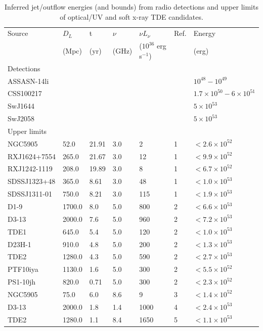 \documentclass[usenatbib,fleqn]{mnras}
\begin{document}
\begin{table}
\begin{threeparttable}
  \caption{\label{tab:enConstr} Inferred jet/outflow energies (and bounds) from radio detections and upper limits of optical/UV
    and soft x-ray TDE candidates.}
\begin{tabular*}{1.5\columnwidth}{lllllll}
\hline
Source & $D_L$ & t & $\nu$ & $\nu L_{\nu}$ & Ref. & Energy\\
& (Mpc) & (yr) & (GHz) & ($10^{36}$ erg s$^{-1}$) & & (erg) \\
\hline
Detections \\
\hline
ASSASN-14li & & & & & &  $10^{48}-10^{49}$\\
CSS100217 & & & & & & $1.7\times 10^{50}-6\times 10^{51}$\\
SwJ1644 & & & & & & $5\times 10^{53}$\\
SwJ2058 & & & & & & $5\times 10^{53}$\\ 
\hline 
Upper limits & \\
\hline
NGC5905 & 52.0 & 21.91 & 3.0 & 2 & 1 & $< 2.6 \times 10^{ 52 }$ \\
RXJ1624+7554 & 265.0 & 21.67 & 3.0 & 12 & 1 & $< 9.9 \times 10^{ 52 }$ \\
RXJ1242-1119 & 208.0 & 19.89 & 3.0 & 8 & 1 & $< 6.7 \times 10^{ 52 }$ \\
SDSSJ1323+48 & 365.0 & 8.61 & 3.0 & 48 & 1 & $< 1.0 \times 10^{ 53 }$ \\
SDSSJ1311-01 & 750.0 & 8.21 & 3.0 & 115 & 1 & $< 1.9 \times 10^{ 53 }$ \\
D1-9 & 1700.0 & 8.0 & 5.0 & 800 & 2 & $< 6.6 \times 10^{ 53 }$ \\
D3-13 & 2000.0 & 7.6 & 5.0 & 960 & 2 & $< 7.2 \times 10^{ 53 }$ \\
TDE1 & 645.0 & 5.4 & 5.0 & 120 & 2 & $< 1.0 \times 10^{ 53 }$ \\
D23H-1 & 910.0 & 4.8 & 5.0 & 200 & 2 & $< 1.3 \times 10^{ 53 }$ \\
TDE2 & 1280.0 & 4.3 & 5.0 & 590 & 2 & $< 2.7 \times 10^{ 53 }$ \\
PTF10iya & 1130.0 & 1.6 & 5.0 & 300 & 2 & $< 5.5 \times 10^{ 52 }$ \\
PS1-10jh & 820.0 & 0.71 & 5.0 & 300 & 2 & $< 2.3 \times 10^{ 52 }$ \\
NGC5905 & 75.0 & 6.0 & 8.6 & 9 & 3 & $< 1.4 \times 10^{ 52 }$ \\
D3-13 & 2000.0 & 1.8 & 1.4 & 1000 & 4 & $< 2.4 \times 10^{ 53 }$ \\
TDE2 & 1280.0 & 1.1 & 8.4 & 1650 & 5 & $< 1.1 \times 10^{ 53 }$ \\

\end{tabular*}
\end{threeparttable}
\end{table}
\end{document}
